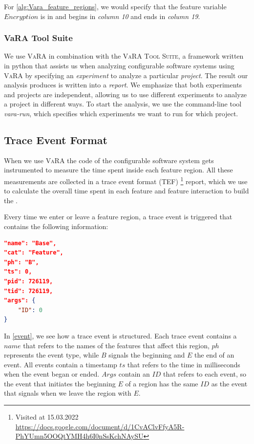 For \autoref{alg:Vara_feature_regions}, we would specify that the feature variable
$Encryption$ is in  and begins in \emph{column 10} and ends in \emph{column 19}.

\subsubsection{VaRA Tool Suite}
We use \textsc{VaRA} in combination with the \textsc{VaRA Tool Suite}, a framework written in python that assists us 
when analyzing configurable software systems using \textsc{VaRA} by specifying an \emph{experiment} to analyze a particular \emph{project}. 
The result our analysis produces is written into a \emph{report}. We emphasize that both experiments and projects are independent, 
allowing us to use different experiments to analyze a project in different ways.
To start the analysis, we use the command-line tool \emph{vara-run}, which specifies which experiments we want to run for which project.

\subsection{Trace Event Format}\label{ch:trace-event}
When we use \textsc{VaRA} the code of the configurable software system gets instrumented to measure the time spent inside each feature region.
All these measurements are collected in a trace event format (\acs{TEF})
\footnote{Visited at 15.03.2022 \\ \url{https://docs.google.com/document/d/1CvAClvFfyA5R-PhYUmn5OOQtYMH4h6I0nSsKchNAySU}} report,
which we use to calculate the overall time spent in each feature and feature interaction to build the {\perfInfluenceModel}.

Every time we enter or leave a feature region, a trace event is triggered that contains the following information:\\

\begin{minipage}{\linewidth}
\begin{lstlisting}[caption={Example of a feature region trace entry in the \acs{TEF} file},captionpos=b,language=json,firstnumber=1,label={event}]
"name": "Base",
"cat": "Feature",
"ph": "B",
"ts": 0,
"pid": 726119,
"tid": 726119,
"args": {
    "ID": 0
}
\end{lstlisting}
\end{minipage}
In \autoref{event}, we see how a trace event is structured. Each trace event contains a $name$ that refers to the names of the features that affect this
region, $ph$ represents the event type, while $B$ signals the beginning and $E$ the end of an event.
All events contain a timestamp $ts$ that refers to the time in milliseconds when the event began or ended.
$Args$ contain an $ID$ that refers to each event, so the event that initiates the beginning $E$ of a region has the same $ID$ as the event that signals when
we leave the region with $E$.

